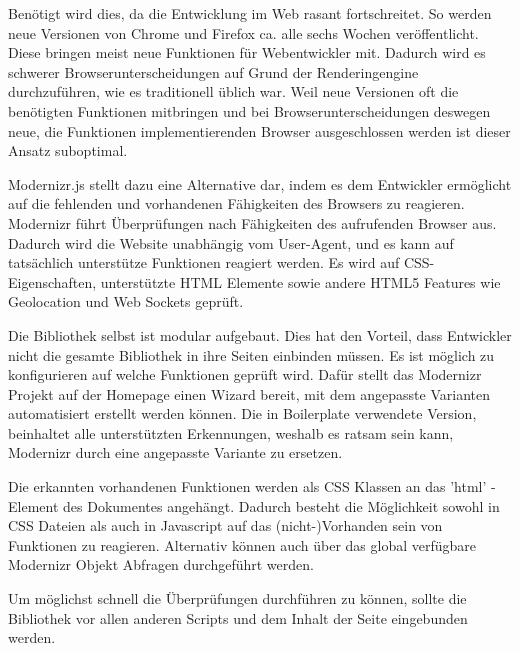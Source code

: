 \documentclass[12pt,journal,compsoc]{IEEEtran}
\begin{document}
Benötigt wird dies, da die Entwicklung im Web rasant fortschreitet. So werden neue Versionen von Chrome und Firefox ca. alle sechs Wochen veröffentlicht.
Diese bringen meist neue  Funktionen für Webentwickler mit. Dadurch wird es schwerer Browserunterscheidungen auf Grund der Renderingengine durchzuführen, wie es traditionell üblich war.
Weil neue Versionen oft die benötigten Funktionen mitbringen und bei Browserunterscheidungen deswegen neue, die Funktionen implementierenden Browser ausgeschlossen werden ist dieser Ansatz suboptimal.

Modernizr.js stellt dazu eine Alternative dar, indem es dem Entwickler ermöglicht auf die fehlenden und vorhandenen Fähigkeiten des Browsers zu reagieren.
Modernizr führt Überprüfungen nach Fähigkeiten des aufrufenden Browser aus.
Dadurch wird die Website unabhängig vom User-Agent, und es kann auf tatsächlich unterstütze Funktionen reagiert werden.
Es wird auf CSS-Eigenschaften, unterstützte HTML Elemente sowie andere HTML5 Features wie Geolocation und Web Sockets geprüft. 

Die Bibliothek selbst ist modular aufgebaut. Dies hat den Vorteil, dass Entwickler nicht die gesamte Bibliothek in ihre Seiten einbinden müssen.
Es ist möglich zu konfigurieren auf welche Funktionen geprüft wird. Dafür stellt das Modernizr Projekt auf der Homepage einen Wizard bereit,
mit dem angepasste Varianten automatisiert erstellt werden können.
Die in Boilerplate verwendete Version, beinhaltet alle unterstützten Erkennungen, weshalb es ratsam sein kann, Modernizr durch eine angepasste Variante zu ersetzen.

Die erkannten vorhandenen Funktionen werden als CSS Klassen an das 'html' -Element des Dokumentes angehängt.
Dadurch besteht die Möglichkeit sowohl in CSS Dateien als auch in Javascript auf das (nicht-)Vorhanden sein von Funktionen zu reagieren.
Alternativ können auch über das global verfügbare Modernizr Objekt Abfragen durchgeführt werden.



Um möglichst schnell die Überprüfungen durchführen zu können, sollte die Bibliothek vor allen anderen Scripts und dem Inhalt der Seite eingebunden werden.
\end{document}
